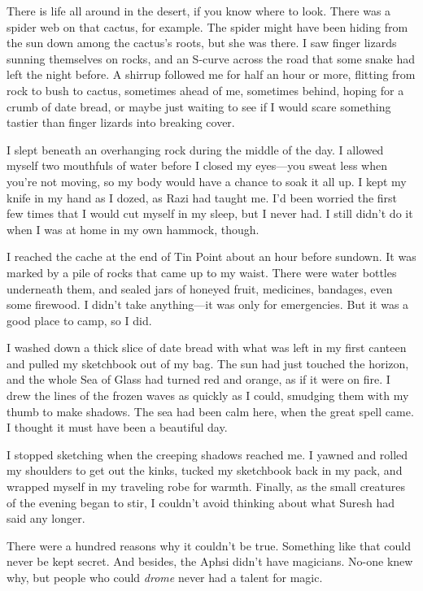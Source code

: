 There is life all around in the desert, if you know where to look.
There was a spider web on that cactus, for example.  The spider might
have been hiding from the sun down among the cactus's roots, but she
was there.  I saw finger lizards sunning themselves on rocks, and an
S-curve across the road that some snake had left the night before.  A
shirrup followed me for half an hour or more, flitting from rock to
bush to cactus, sometimes ahead of me, sometimes behind, hoping for a
crumb of date bread, or maybe just waiting to see if I would scare
something tastier than finger lizards into breaking cover.

I slept beneath an overhanging rock during the middle of the day.  I
allowed myself two mouthfuls of water before I closed my eyes---you
sweat less when you're not moving, so my body would have a chance to
soak it all up.  I kept my knife in my hand as I dozed, as Razi had
taught me.  I'd been worried the first few times that I would cut
myself in my sleep, but I never had.  I still didn't do it when I was
at home in my own hammock, though.

I reached the cache at the end of Tin Point about an hour before
sundown.  It was marked by a pile of rocks that came up to my waist.
There were water bottles underneath them, and sealed jars of honeyed
fruit, medicines, bandages, even some firewood.  I didn't take
anything---it was only for emergencies.  But it was a good place to
camp, so I did.

I washed down a thick slice of date bread with what was left in my
first canteen and pulled my sketchbook out of my bag.  The sun had
just touched the horizon, and the whole Sea of Glass had turned red
and orange, as if it were on fire.  I drew the lines of the frozen
waves as quickly as I could, smudging them with my thumb to make
shadows.  The sea had been calm here, when the great spell came.  I
thought it must have been a beautiful day.

I stopped sketching when the creeping shadows reached me.  I yawned
and rolled my shoulders to get out the kinks, tucked my sketchbook
back in my pack, and wrapped myself in my traveling robe for warmth.
Finally, as the small creatures of the evening began to stir, I
couldn't avoid thinking about what Suresh had said any longer.

There were a hundred reasons why it couldn't be true.  Something like
that could never be kept secret.  And besides, the Aphsi didn't have
magicians.  No-one knew why, but people who could \emph{drome} never had a
talent for magic.

